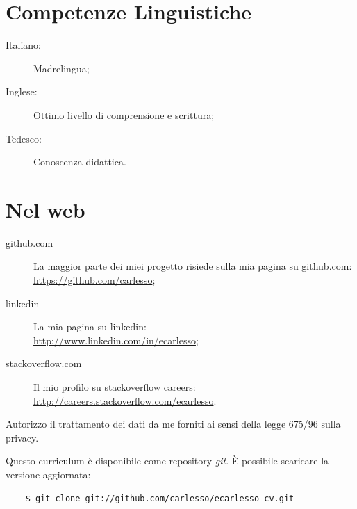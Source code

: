 \documentclass[pdftex, a4paper, 11pt]{article}
\begin{document}
\section*{Competenze Linguistiche}
\begin{description}
\item[Italiano:] Madrelingua;
\item[Inglese:] Ottimo livello di comprensione e scrittura;
\item[Tedesco:] Conoscenza didattica.
\end{description}

\section*{Nel web}
\begin{description}
\item[github.com] La maggior parte dei miei progetto risiede sulla mia pagina su github.com: \\ \mbox{\url{https://github.com/carlesso}};
\item[linkedin] La mia pagina su linkedin: \\ \url{http://www.linkedin.com/in/ecarlesso};
\item[stackoverflow.com] Il mio profilo su stackoverflow careers: \\ \url{http://careers.stackoverflow.com/ecarlesso}.
\end{description}

\vfill

Autorizzo il trattamento dei dati da me forniti ai sensi della legge
675/96 sulla privacy.

\vspace{1cm}

\footnotesize {Questo curriculum \`e disponibile come repository {\em git}. \`E possibile scaricare la versione aggiornata:}
\begin{verbatim}
    $ git clone git://github.com/carlesso/ecarlesso_cv.git
\end{verbatim}
\end{document}
